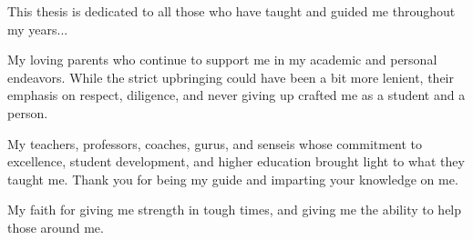 \documentclass[12pt,american]{report}
\begin{document}
\copyrightfalse%
{}

\beforepreface%

\vfill
\begin{center}
This thesis is dedicated to all those who have taught and guided me throughout my years... 


My loving parents who continue to support me in my academic and personal endeavors.  While the strict upbringing could have been a bit more lenient, their emphasis on respect, diligence, and never giving up crafted me as a student and a person.  


My teachers, professors, coaches, gurus, and senseis whose commitment to excellence, student development, and higher education brought light to what they taught me.  Thank you for being my guide and imparting your knowledge on me.


My faith for giving me strength in tough times, and giving me the ability to help those around me.
\end{center}
\vfill
\end{document}
